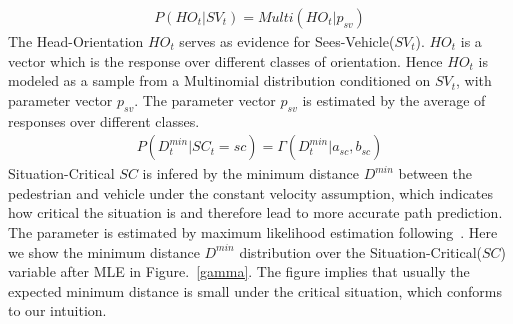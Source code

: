 \documentclass[10pt,twocolumn,letterpaper]{article}
\begin{document}
    \begin{eqnarray*}
        P(HO_t|SV_t) = Multi(HO_t|p_{sv})
    \end{eqnarray*}
    The Head-Orientation $HO_t$ serves as evidence for Sees-Vehicle($SV_t$). $HO_t$ 
    is a vector which is the response over different classes of orientation. Hence 
    $HO_t$ is modeled as a sample from a Multinomial distribution conditioned on $SV_t$,
    with parameter vector $p_{sv}$. 
    The parameter vector $p_{sv}$ is estimated by the average of responses over different
    classes. 
    \begin{eqnarray*}
        P(D_t^{min}|SC_t = sc) = \Gamma(D_t^{min}|a_{sc}, b_{sc})    
    \end{eqnarray*}
    Situation-Critical $SC$ is infered by the minimum distance $D^{min}$ between 
    the pedestrian and vehicle under the constant velocity assumption, which indicates
    how critical the situation is and therefore lead to more accurate path prediction.
    The parameter is estimated by maximum likelihood estimation following~\cite{IEEEhowto:gamma}.
    Here we show the minimum distance $D^{min}$ distribution over the Situation-Critical($SC$)
    variable after MLE in Figure.~\ref{gamma}. The figure implies that usually the expected
    minimum distance is small under the critical situation, which conforms to our intuition.
\end{document}
